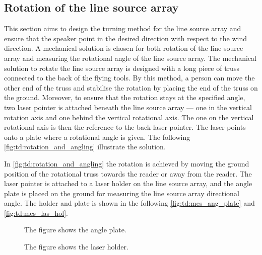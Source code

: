 \subsection{Rotation of the line source array}
This section aims to design the turning method for the line source array and ensure that the speaker point in the desired direction with respect to the wind direction. A mechanical solution is chosen for both rotation of the line source array and measuring the rotational angle of the line source array. The mechanical solution to rotate the line source array is designed with a long piece of truss connected to the back of the flying tools. By this method, a person can move the other end of the truss and stabilise the rotation by placing the end of the truss on the ground. Moreover, to ensure that the rotation stays at the specified angle, two laser pointer is attached beneath the line source array — one in the vertical rotation axis and one behind the vertical rotational axis. The one on the vertical rotational axis is then the reference to the back laser pointer. The laser points onto a plate where a rotational angle is given. The following \autoref{fig:td:rotation_and_angling} illustrate the solution.


In \autoref{fig:td:rotation_and_angling} the rotation is achieved by moving the ground position of the rotational truss towards the reader or away from the reader. The laser pointer is attached to a laser holder on the line source array, and the angle plate is placed on the ground for measuring the line source array directional angle. The holder and plate is shown in the following \autoref{fig:td:mes_ang_plate} and \autoref{fig:td:mes_las_hol}.


\begin{figure}[H]
    \centering
     \captionsetup{width=1\linewidth}
    \begin{minipage}{0.36\textwidth}
        \centering
         \captionsetup{width=0.90\linewidth}
       
        \caption{The figure shows the angle plate.}
        \label{fig:td:mes_ang_plate}
    \end{minipage}%
    \begin{minipage}{0.56\textwidth}
        \centering
         \captionsetup{width=0.90\linewidth}
        
        \caption{The figure shows the laser holder.}
        \label{fig:td:mes_las_hol}
    \end{minipage}
\end{figure}


